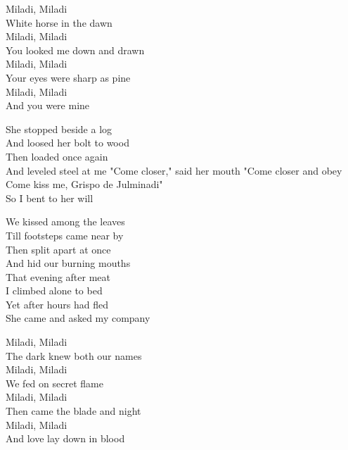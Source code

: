 \begin{lyrics}
Miladi, Miladi\\
White horse in the dawn\\
Miladi, Miladi\\
You looked me down and drawn\\
Miladi, Miladi\\
Your eyes were sharp as pine\\
Miladi, Miladi\\
And you were mine

She stopped beside a log\\
And loosed her bolt to wood\\
Then loaded once again\\
And leveled steel at me
"Come closer," said her mouth
"Come closer and obey\\
Come kiss me, Grispo de Julminadi"\\
So I bent to her will

We kissed among the leaves\\
Till footsteps came near by\\
Then split apart at once\\
And hid our burning mouths\\
That evening after meat\\
I climbed alone to bed\\
Yet after hours had fled\\
She came and asked my company

Miladi, Miladi\\
The dark knew both our names\\
Miladi, Miladi\\
We fed on secret flame\\
Miladi, Miladi\\
Then came the blade and night\\
Miladi, Miladi\\
And love lay down in blood
\end{lyrics}

